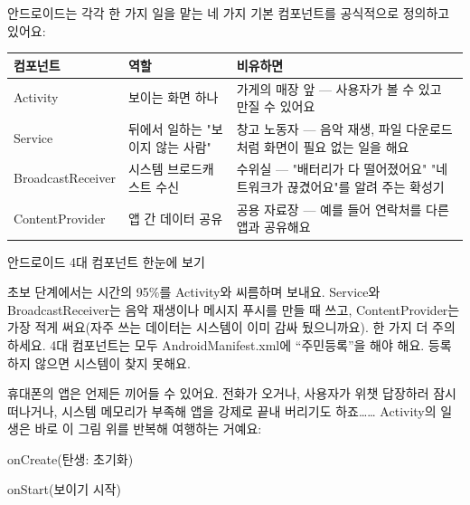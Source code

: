 


안드로이드는 각각 한 가지 일을 맡는 네 가지 기본 컴포넌트를 공식적으로 정의하고 있어요:

\begin{center}
\begin{tabularx}{\linewidth}{|X|X|X|}
\hline
\textbf{컴포넌트} & \textbf{역할} & \textbf{비유하면} \tabularnewline
\hline
Activity & 보이는 화면 하나 & 가게의 매장 앞 — 사용자가 볼 수 있고 만질 수 있어요 \tabularnewline
Service & 뒤에서 일하는 "보이지 않는 사람" & 창고 노동자 — 음악 재생, 파일 다운로드처럼 화면이 필요 없는 일을 해요 \tabularnewline
BroadcastReceiver & 시스템 브로드캐스트 수신 & 수위실 — "배터리가 다 떨어졌어요" "네트워크가 끊겼어요"를 알려 주는 확성기 \tabularnewline
ContentProvider & 앱 간 데이터 공유 & 공용 자료장 — 예를 들어 연락처를 다른 앱과 공유해요 \tabularnewline
\hline
\end{tabularx}
\end{center}

\begin{center}\small\color{gray}안드로이드 4대 컴포넌트 한눈에 보기\end{center}

초보 단계에서는 시간의 95\%를 Activity와 씨름하며 보내요. Service와 BroadcastReceiver는 음악 재생이나 메시지 푸시를 만들 때 쓰고, ContentProvider는 가장 적게 써요(자주 쓰는 데이터는 시스템이 이미 감싸 뒀으니까요). 한 가지 더 주의하세요. 4대 컴포넌트는 모두 AndroidManifest.xml에 “주민등록”을 해야 해요. 등록하지 않으면 시스템이 찾지 못해요.


휴대폰의 앱은 언제든 끼어들 수 있어요. 전화가 오거나, 사용자가 위챗 답장하러 잠시 떠나거나, 시스템 메모리가 부족해 앱을 강제로 끝내 버리기도 하죠…… Activity의 일생은 바로 이 그림 위를 반복해 여행하는 거예요:

onCreate(탄생: 초기화)

onStart(보이기 시작)

